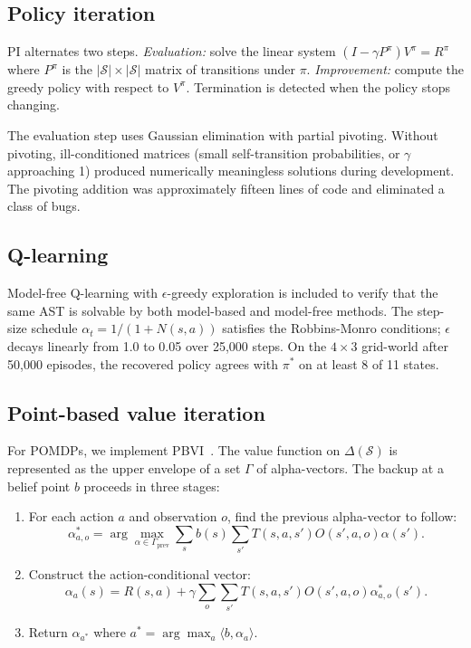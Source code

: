 \documentclass[conference]{IEEEtran}
\begin{document}
\subsection{Policy iteration}

PI alternates two steps. \emph{Evaluation:} solve the linear system
$(I - \gamma P^\pi) V^\pi = R^\pi$ where $P^\pi$ is the
$|\mathcal{S}| \times |\mathcal{S}|$ matrix of transitions under
$\pi$. \emph{Improvement:} compute the greedy policy with respect to
$V^\pi$. Termination is detected when the policy stops changing.

The evaluation step uses Gaussian elimination with partial pivoting.
Without pivoting, ill-conditioned matrices (small self-transition
probabilities, or $\gamma$ approaching 1) produced numerically
meaningless solutions during development. The pivoting addition was
approximately fifteen lines of code and eliminated a class of bugs.

\subsection{Q-learning}

Model-free Q-learning with $\epsilon$-greedy exploration is included
to verify that the same AST is solvable by both model-based and
model-free methods. The step-size schedule
$\alpha_t = 1 / (1 + N(s, a))$ satisfies the Robbins-Monro
conditions; $\epsilon$ decays linearly from 1.0 to 0.05 over 25{,}000
steps. On the $4 \times 3$ grid-world after 50{,}000 episodes, the
recovered policy agrees with $\pi^*$ on at least 8 of 11 states.

\subsection{Point-based value iteration}

For POMDPs, we implement PBVI~\cite{pineau2003point}. The value
function on $\Delta(\mathcal{S})$ is represented as the upper
envelope of a set $\Gamma$ of alpha-vectors. The backup at a belief
point $b$ proceeds in three stages:

\begin{enumerate}
\item For each action $a$ and observation $o$, find the previous
alpha-vector to follow:
\[
\alpha^*_{a,o} = \arg\max_{\alpha \in \Gamma_\text{prev}} \sum_s b(s) \sum_{s'} T(s,a,s') O(s',a,o) \alpha(s').
\]
\item Construct the action-conditional vector:
\[
\alpha_a(s) = R(s,a) + \gamma \sum_o \sum_{s'} T(s,a,s') O(s',a,o) \alpha^*_{a,o}(s').
\]
\item Return $\alpha_{a^*}$ where $a^* = \arg\max_a \langle b, \alpha_a \rangle$.
\end{enumerate}
\end{document}
